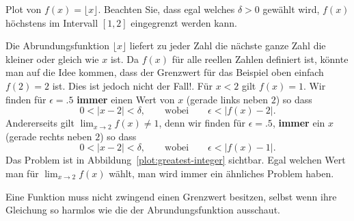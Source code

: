 \begin{marginfigure}[0in]
\caption{Plot von $f(x)=\lfloor x\rfloor$. Beachten Sie, dass egal welches $\delta>0$ gewählt wird, $f(x)$ höchstens im Intervall $[1,2]$ eingegrenzt werden kann.}
\label{plot:greatest-integer}
\end{marginfigure}
\begin{solution}
Die Abrundungsfunktion $\lfloor x \rfloor$ liefert zu jeder Zahl die nächste ganze Zahl die kleiner oder gleich wie $x$ ist. Da $f(x)$ für alle reellen Zahlen definiert ist, könnte man auf die Idee kommen, dass der Grenzwert für das Beispiel oben einfach $f(2)=2$ ist. Dies ist jedoch nicht der Fall!. 
Für $x<2$ gilt $f(x)=1$. Wir finden für $\epsilon =.5$ \textbf{immer} einen Wert von $x$ (gerade links neben $2$) so dass
\[
0< |x -2|< \delta, \qquad\text{wobei} \qquad \epsilon < |f(x)-2|.
\]
Andererseits gilt $\lim_{x\to 2} f(x)\ne 1$, denn wir finden für
$\epsilon=.5$, \textbf{immer} ein $x$ (gerade rechts neben $2$) so dass
\[
0<|x- 2|<\delta, \qquad\text{wobei} \qquad  \epsilon<|f(x)-1|.
\]
Das Problem ist in Abbildung~\ref{plot:greatest-integer} sichtbar. Egal welchen Wert man für $\lim_{x\to 2} f(x)$ wählt, man wird immer ein ähnliches Problem haben.
\end{solution}

Eine Funktion muss nicht zwingend einen Grenzwert besitzen, selbst wenn ihre Gleichung so harmlos wie die der Abrundungsfunktion ausschaut.

